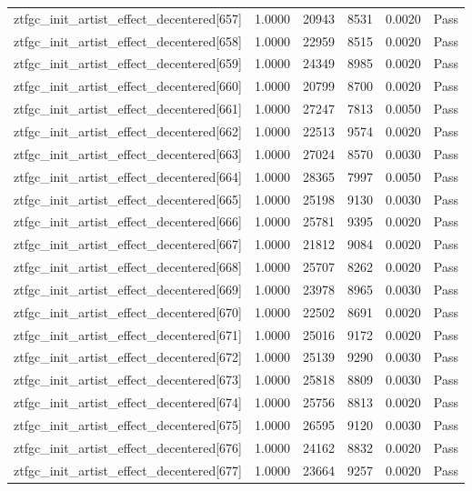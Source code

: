 \begin{table}[htbp]
\begin{tabular}{llrrll}
ztfgc\_init\_artist\_effect\_decentered[657] & 1.0000 & 20943 & 8531 & 0.0020 & Pass \\
ztfgc\_init\_artist\_effect\_decentered[658] & 1.0000 & 22959 & 8515 & 0.0020 & Pass \\
ztfgc\_init\_artist\_effect\_decentered[659] & 1.0000 & 24349 & 8985 & 0.0020 & Pass \\
ztfgc\_init\_artist\_effect\_decentered[660] & 1.0000 & 20799 & 8700 & 0.0020 & Pass \\
ztfgc\_init\_artist\_effect\_decentered[661] & 1.0000 & 27247 & 7813 & 0.0050 & Pass \\
ztfgc\_init\_artist\_effect\_decentered[662] & 1.0000 & 22513 & 9574 & 0.0020 & Pass \\
ztfgc\_init\_artist\_effect\_decentered[663] & 1.0000 & 27024 & 8570 & 0.0030 & Pass \\
ztfgc\_init\_artist\_effect\_decentered[664] & 1.0000 & 28365 & 7997 & 0.0050 & Pass \\
ztfgc\_init\_artist\_effect\_decentered[665] & 1.0000 & 25198 & 9130 & 0.0030 & Pass \\
ztfgc\_init\_artist\_effect\_decentered[666] & 1.0000 & 25781 & 9395 & 0.0020 & Pass \\
ztfgc\_init\_artist\_effect\_decentered[667] & 1.0000 & 21812 & 9084 & 0.0020 & Pass \\
ztfgc\_init\_artist\_effect\_decentered[668] & 1.0000 & 25707 & 8262 & 0.0020 & Pass \\
ztfgc\_init\_artist\_effect\_decentered[669] & 1.0000 & 23978 & 8965 & 0.0030 & Pass \\
ztfgc\_init\_artist\_effect\_decentered[670] & 1.0000 & 22502 & 8691 & 0.0020 & Pass \\
ztfgc\_init\_artist\_effect\_decentered[671] & 1.0000 & 25016 & 9172 & 0.0020 & Pass \\
ztfgc\_init\_artist\_effect\_decentered[672] & 1.0000 & 25139 & 9290 & 0.0030 & Pass \\
ztfgc\_init\_artist\_effect\_decentered[673] & 1.0000 & 25818 & 8809 & 0.0030 & Pass \\
ztfgc\_init\_artist\_effect\_decentered[674] & 1.0000 & 25756 & 8813 & 0.0020 & Pass \\
ztfgc\_init\_artist\_effect\_decentered[675] & 1.0000 & 26595 & 9120 & 0.0030 & Pass \\
ztfgc\_init\_artist\_effect\_decentered[676] & 1.0000 & 24162 & 8832 & 0.0020 & Pass \\
ztfgc\_init\_artist\_effect\_decentered[677] & 1.0000 & 23664 & 9257 & 0.0020 & Pass \\

\end{tabular}
\end{table}
